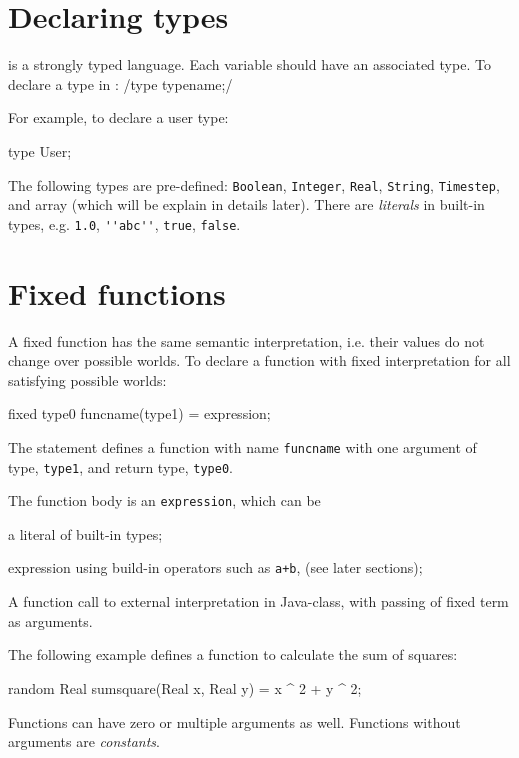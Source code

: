 \documentclass[12pt]{article}
\begin{document}
\section{Declaring types}
\bl is a strongly typed language. Each variable should have an associated type.
 To declare a type in \bl:
\blog/type typename;/

For example, to declare a user type:
\begin{blogcode}
type User;
\end{blogcode}

The following types are pre-defined: \verb|Boolean|, \verb|Integer|, \verb|Real|, \verb|String|, \verb|Timestep|,  and array (which will be explain in details later).
There are \emph{literals} in built-in types, e.g. \verb|1.0|, \verb|''abc''|, \verb|true|, \verb|false|.


\section{Fixed functions}
A fixed function has the same semantic interpretation, i.e. their values do not change over possible worlds. 
To declare a function with fixed interpretation for all satisfying possible worlds:
\begin{blogcode}
fixed type0 funcname(type1) = expression;
\end{blogcode}
The statement defines a function with name \texttt{funcname} with one argument of type, \texttt{type1}, and return type, \texttt{type0}. 

The function body is an \texttt{expression}, which can be
\begin{itemize*}
\item a literal of built-in types;
\item expression using build-in operators  such as \verb|a+b|, (see later sections);
\item A function call to external interpretation in Java-class, with passing of fixed term as arguments. 
\end{itemize*}

The following example defines a function to calculate the sum of squares:
\begin{blogcode}
random Real sumsquare(Real x, Real y) = x ^ 2 + y ^ 2;
\end{blogcode}

Functions can have zero or multiple arguments as well. Functions without arguments are \emph{constants}. 
\end{document}
